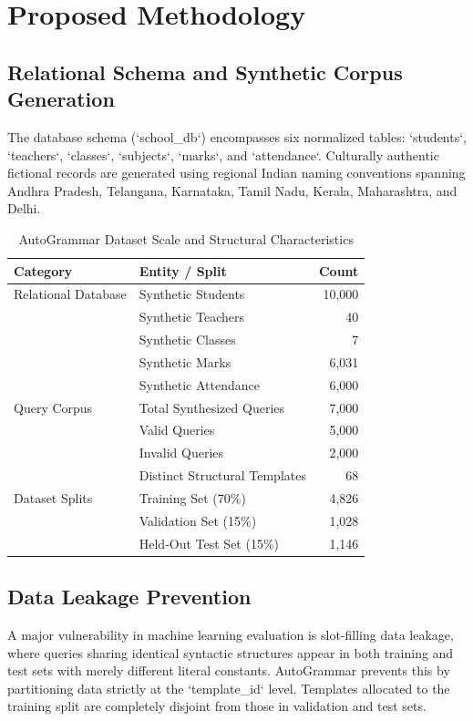 \documentclass[11pt,a4paper]{article}
\begin{document}
\section{Proposed Methodology}

\subsection{Relational Schema and Synthetic Corpus Generation}
The database schema (`school_db`) encompasses six normalized tables: `students`, `teachers`, `classes`, `subjects`, `marks`, and `attendance`. Culturally authentic fictional records are generated using regional Indian naming conventions spanning Andhra Pradesh, Telangana, Karnataka, Tamil Nadu, Kerala, Maharashtra, and Delhi.

\begin{table}[h]
\centering
\caption{AutoGrammar Dataset Scale and Structural Characteristics}
\label{tab:dataset_stats}
\begin{tabular}{llr}
\toprule
\textbf{Category} & \textbf{Entity / Split} & \textbf{Count} \\
\midrule
Relational Database & Synthetic Students & 10,000 \\
& Synthetic Teachers & 40 \\
& Synthetic Classes & 7 \\
& Synthetic Marks & 6,031 \\
& Synthetic Attendance & 6,000 \\
\midrule
Query Corpus & Total Synthesized Queries & 7,000 \\
& Valid Queries & 5,000 \\
& Invalid Queries & 2,000 \\
& Distinct Structural Templates & 68 \\
\midrule
Dataset Splits & Training Set (70\%) & 4,826 \\
& Validation Set (15\%) & 1,028 \\
& Held-Out Test Set (15\%) & 1,146 \\
\bottomrule
\end{tabular}
\end{table}

\subsection{Data Leakage Prevention}
A major vulnerability in machine learning evaluation is slot-filling data leakage, where queries sharing identical syntactic structures appear in both training and test sets with merely different literal constants. AutoGrammar prevents this by partitioning data strictly at the `template_id` level. Templates allocated to the training split are completely disjoint from those in validation and test sets.
\end{document}
